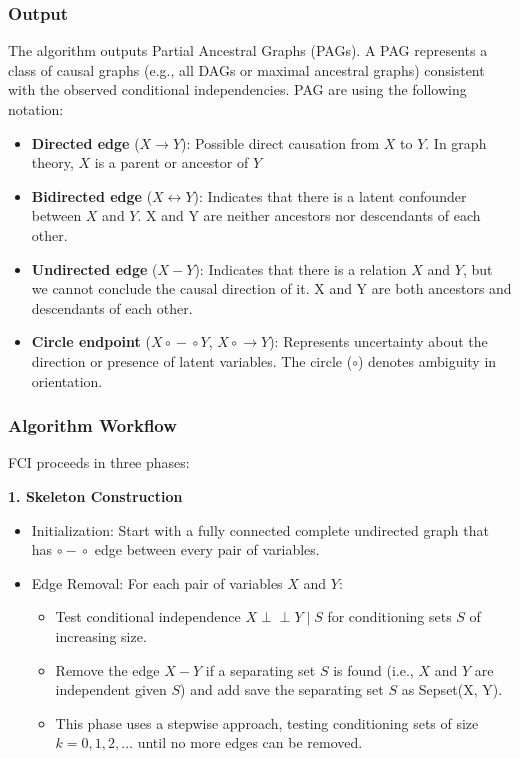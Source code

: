 \documentclass[main.tex]{subfiles}
\begin{document}
\subsubsection{Output}
The algorithm outputs Partial Ancestral Graphs (PAGs). A PAG represents a class of causal graphs (e.g., all DAGs or maximal ancestral graphs) consistent with the observed conditional independencies. PAG are using the following notation:
\begin{itemize}
        \item \textbf{Directed edge} ($X \rightarrow Y$): Possible direct causation from $X$ to $Y$. In graph theory, $X$ is a parent or ancestor of $Y$
        \item \textbf{Bidirected edge} ($X \leftrightarrow Y$): Indicates that there is a latent confounder between $X$ and $Y$. X and Y are neither ancestors nor descendants of each other.
        \item \textbf{Undirected edge} ($X - Y$): Indicates that there is a relation $X$ and $Y$, but we cannot conclude the causal direction of it. X and Y are both ancestors and descendants of each other.
        \item \textbf{Circle endpoint} ($X \circ\!\!-\!\!\circ Y$, $X \circ\!\!\rightarrow Y$): Represents uncertainty about the direction or presence of latent variables. The circle ($\circ$) denotes ambiguity in orientation.
    \end{itemize}
    
\subsubsection{Algorithm Workflow}
FCI proceeds in three phases:

\textbf{1. Skeleton Construction}
\begin{itemize}
  \item Initialization: Start with a fully connected complete undirected graph that has $\circ\!\!-\!\!\circ$ edge between every pair of variables.
  \item Edge Removal: For each pair of variables $X$ and $Y$:
    \begin{itemize}
      \item Test conditional independence $X \perp\!\!\!\perp Y \mid S$ for conditioning sets $S$ of increasing size.
      \item Remove the edge $X - Y$ if a separating set $S$ is found (i.e., $X$ and $Y$ are independent given $S$) and add save the separating set $S$ as Sepset(X, Y). 
      \item This phase uses a stepwise approach, testing conditioning sets of size $k = 0, 1, 2, \dots$ until no more edges can be removed.
    \end{itemize}
\end{itemize}
\end{document}
